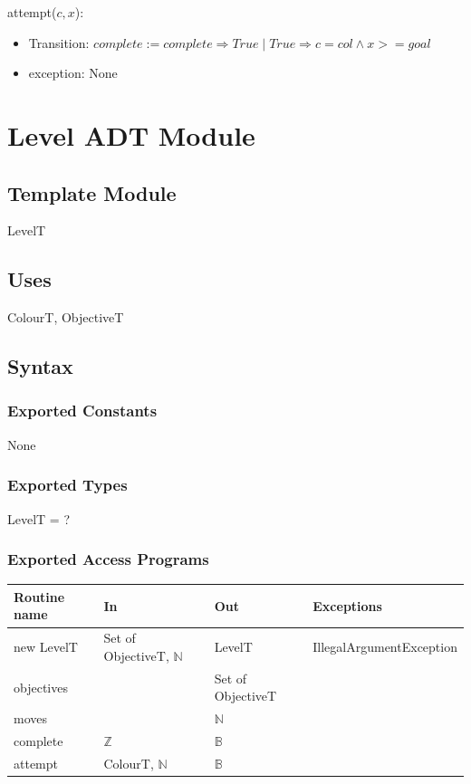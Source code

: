 \documentclass[12pt]{article}
\newcommand{\Implies}{\Rightarrow}
\begin{document}
\noindent attempt($c, x$):
\begin{itemize}
	\item Transition: $complete := complete \Implies True \mid True \Implies c = col \land x >= goal$
	\item exception: None
\end{itemize}

\newpage

\section* {Level ADT Module}

\subsection*{Template Module}

LevelT

\subsection* {Uses}

ColourT, ObjectiveT

\subsection* {Syntax}

\subsubsection* {Exported Constants}

None

\subsubsection* {Exported Types}

LevelT = ?

\subsubsection* {Exported Access Programs}

\begin{tabular}{| l | l | l | l |}
	\hline
	\textbf{Routine name} & \textbf{In} & \textbf{Out} & \textbf{Exceptions}\\
	\hline
	new LevelT & Set of ObjectiveT, $\mathbb{N}$ & LevelT & IllegalArgumentException\\
	\hline
	objectives & ~ & Set of ObjectiveT & ~\\
	\hline
	moves & ~ & $\mathbb{N}$ & ~\\
	\hline
	complete & $\mathbb{Z}$ & $\mathbb{B}$ & ~\\
	\hline
	attempt & ColourT, $\mathbb{N}$ & $\mathbb{B}$ & ~\\
	\hline
\end{tabular}
\end{document}
